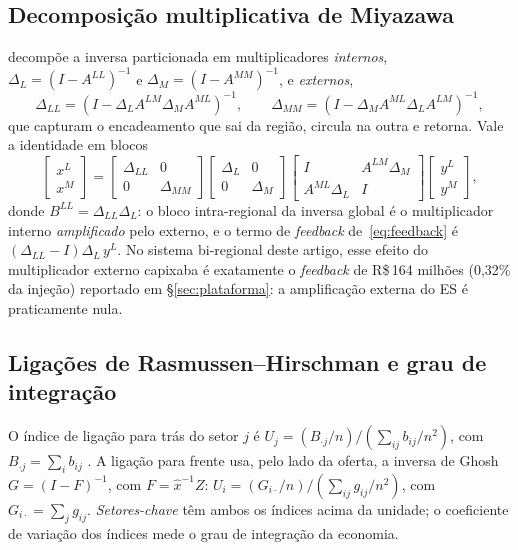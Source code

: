 \documentclass[11pt,a4paper]{article}
\begin{document}
\subsection{Decomposição multiplicativa de Miyazawa}
\label{ap:miyazawa}
\citet{miyazawa1966} decompõe a inversa particionada em multiplicadores \emph{internos},
$\Delta_L=(I-A^{LL})^{-1}$ e $\Delta_M=(I-A^{MM})^{-1}$, e \emph{externos},
\begin{equation}
\Delta_{LL}=(I-\Delta_L A^{LM}\Delta_M A^{ML})^{-1},
\qquad
\Delta_{MM}=(I-\Delta_M A^{ML}\Delta_L A^{LM})^{-1},
\label{eq:miyazawa_ext}
\end{equation}
que capturam o encadeamento que sai da região, circula na outra e retorna. Vale a
identidade em blocos
\begin{equation}
\begin{bmatrix} x^{L}\\ x^{M}\end{bmatrix}
=\begin{bmatrix} \Delta_{LL} & 0\\ 0 & \Delta_{MM}\end{bmatrix}
\begin{bmatrix} \Delta_{L} & 0\\ 0 & \Delta_{M}\end{bmatrix}
\begin{bmatrix} I & A^{LM}\Delta_{M}\\ A^{ML}\Delta_{L} & I\end{bmatrix}
\begin{bmatrix} y^{L}\\ y^{M}\end{bmatrix},
\label{eq:miyazawa}
\end{equation}
donde $B^{LL}=\Delta_{LL}\Delta_L$: o bloco intra-regional da inversa global é o
multiplicador interno \emph{amplificado} pelo externo, e o termo de \emph{feedback}
de~\eqref{eq:feedback} é $(\Delta_{LL}-I)\Delta_L\,y^{L}$. No sistema bi-regional deste
artigo, esse efeito do multiplicador externo capixaba é exatamente o \emph{feedback} de
R\$\,164 milhões (0,32\% da injeção) reportado em \S\ref{sec:plataforma}: a amplificação
externa do ES é praticamente nula.

\subsection{Ligações de Rasmussen--Hirschman e grau de integração}
\label{ap:rh}
O índice de ligação para trás do setor $j$ é
$U_j=(B_{\cdot j}/n)\big/(\sum_{ij}b_{ij}/n^2)$, com $B_{\cdot j}=\sum_i b_{ij}$
\citep{rasmussen1956,hirschman1958}. A ligação para frente usa, pelo lado da oferta, a
inversa de Ghosh $G=(I-F)^{-1}$, com $F=\hat{x}^{-1}Z$:
$U_i=(G_{i\cdot}/n)\big/(\sum_{ij}g_{ij}/n^2)$, com $G_{i\cdot}=\sum_j g_{ij}$.
\emph{Setores-chave} têm ambos os índices acima da unidade; o coeficiente de variação dos
índices mede o grau de integração da economia.
\end{document}
